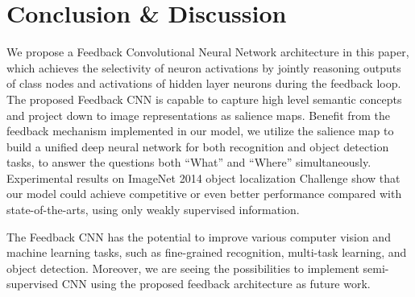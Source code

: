 \section{Conclusion \& Discussion}
\label{sec:conclusion}

We propose a Feedback Convolutional Neural Network architecture in this paper, which achieves the selectivity of neuron activations by jointly reasoning outputs of class nodes and activations of hidden layer neurons during the feedback loop. The proposed Feedback CNN is capable to capture high level semantic concepts and project down to image representations as salience maps. Benefit from the feedback mechanism implemented in our model, we utilize the salience map to build a unified deep neural network for both recognition and object detection tasks, to answer the questions both ``What'' and ``Where'' simultaneously. Experimental results on ImageNet 2014 object localization Challenge show that our model could achieve competitive or even better performance compared with state-of-the-arts, using only weakly supervised information.

The Feedback CNN has the potential to improve various computer vision and machine learning tasks, such as fine-grained recognition, multi-task learning, and object detection. Moreover, we are seeing the possibilities to implement semi-supervised CNN using the proposed feedback architecture as future work.

\begin{comment}
We proposes a Feedback Convolusional Neural Networks for class model visualization and object localization.
Our Feedback Neural Networks can infer the hidden neuron status given the bottom level input image and top level class labels.
Experiments on ImageNet localization challengeindicates that our model is superior in weakly supervised object localization, and further experiments demonstrate its powerfulness in distinguishing objects, even under cluttered backgrounds with multiple objects.

(1) Robust
(2) Multi-task
(3)

Figure 1: We show the powerfulness of feedback neural networks on class model visualization and object localizations, even when an image contains very cluttered background and lots of salient objects. Note that we simply use a pertained feedforward multi-class convnets (GoogleNet) model [] trained with ImageNet dataset where each training image only contains one object and no further training is involved. The feedback neural nets are able to adapt its middle-level hidden layers (usually represents object parts) by combining the bottom-up feedforward image features as well as top-down feedback semantic information. (a) input image (b) class model visualization given the class label: panda, elephant, gorilla, tiger, lion, (c) final object localization results based on the class model visualization.
\end{comment}
